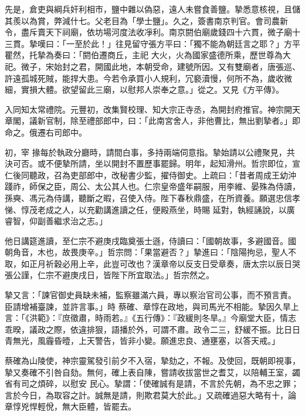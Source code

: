 \begin{pinyinscope}
 先是，倉吏與綱兵奸利相市，鹽中雜以偽惡，遠人未嘗食善鹽。摯悉意核視，且儲其羨以為賞，弊減什七。父老目為「學士鹽」。久之，簽書南京判官。會司農新令，盡斥賣天下祠廟，依坊場河度法收凈利。南京閼伯廟歲錢四十六貫，微子廟十三貫。摯嘆曰：「一至於此！」往見留守張方平曰：「獨不能為朝廷言之耶？」方平瞿然，托摯為奏曰：「閼伯遷商丘，主祀
 大火，火為國家盛德所乘，歷世尊為大祀。微子，宋始封之君，開國此地，本朝受命，建號所因。又有雙廟者，唐張巡、許遠孤城死賊，能捍大患。今若令承買小人規利，冗褻瀆慢，何所不為，歲收微細，實損大體。欲望留此三廟，以慰邦人崇奉之意。」從之。又見《方平傳》。



 入同知太常禮院。元豐初，改集賢校理、知大宗正寺丞，為開封府推官。神宗開天章閣，議新官制，除至禮部郎中，曰：「此南宮舍人，非他曹比，無出劉摯者。」即命之。俄遷右司郎中。



 初，宰
 掾每於執政分廳時，請間白事，多持兩端伺意指。摯始請以公禮聚見，共決可否。或不便摯所請，坐以開封不置歷事罷歸。明年，起知滑州。哲宗即位，宣仁後同聽政，召為吏部郎中，改秘書少監，擢侍御史。上疏曰：「昔者周成王幼沖踐祚，師保之臣，周公、太公其人也。仁宗皇帝盛年嗣服，用李維、晏殊為侍讀，孫奭、馮元為侍講，聽斷之暇，召使入侍。陛下春秋鼎盛，在所資養。願選忠信孝悌、惇茂老成之人，以充勸講進讀之任，便殿燕坐，時賜
 延對，執經誦說，以廣睿智，仰副善繼求治之志。」



 他日講筵進讀，至仁宗不避庚戌臨奠張士遜，侍讀曰：「國朝故事，多避國音。國朝角音，木也，故畏庚辛。」哲宗問：「果當避否？」摯進曰：「陰陽拘忌，聖人不取，如正月祈穀必用上辛，此豈可改也？漢章帝以反支日受章奏，唐太宗以辰日哭張公謹，仁宗不避庚戌日，皆陛下所宜取法。」哲宗然之。



 摯又言：「諫官御史員缺未補，監察雖滿六員，專以察治官司公事，而不預言責。臣請增補臺諫，並許言事。」時
 蔡確、章惇在政地，與司馬光不相能。摯因久旱上言：「《洪範》：『庶徵肅，時雨若。』《五行傳》：『政緩則冬旱。』今廟堂大臣，情志乖暌，議政之際，依違排狠，語播於外，可謂不肅。政令二三，舒緩不振。比日日青無光，風霾昏曀，上天警告，皆非小變。願進忠良、通壅塞，以答天戒。」



 蔡確為山陵使，神宗靈駕發引前夕不入宿，摯劾之，不報。及使回，既朝即視事，摯又奏確不引咎自劾。無何，確上表自陳，嘗請收拔當世之耆艾，以陪輔王室，蠲省有司之煩碎，以慰安
 民心。摯謂：「使確誠有是請，不言於先朝，為不忠之罪；言於今日，為取容之計。誠無是請，則欺君莫大於此。」又疏確過惡大略有十，論章惇兇悍輕侻，無大臣體，皆罷去。




\end{pinyinscope}
